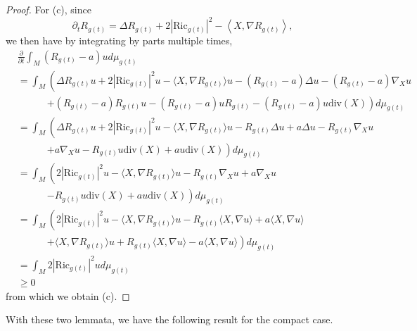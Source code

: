 \documentclass[12pt]{amsart}
\newcommand{\del}{\nabla}
\theoremstyle{remark}
\numberwithin{equation}{section}
\begin{document}
\begin{proof}
    For (c), since
    \begin{equation*}
        \partial_t R_{g(t)} = \Delta R_{g(t)} + 2|\text{Ric}_{g(t)}|^2 - \left\langle X, \del R_{g(t)}\right\rangle,
    \end{equation*}
    we then have by integrating by parts multiple times,
    \begin{align*}
        &\frac{\partial}{\partial t} \int_M (R_{g(t)}-a)ud\mu_{g(t)} \nonumber \\
        &= \int_M \left(\Delta R_{g(t)} u + 2|\text{Ric}_{g(t)}|^2 u - \langle X, \del R_{g(t)}\rangle u - (R_{g(t)} - a)\Delta u - (R_{g(t)} - a)\del_X u \right. \nonumber \\
        &\qquad\quad \left. + (R_{g(t)} - a)R_{g(t)}u - (R_{g(t)} - a)uR_{g(t)} - (R_{g(t)} - a)u\text{div}(X)\right)d\mu_{g(t)} \nonumber \\
        &= \int_M \left( \Delta R_{g(t)} u + 2 |\text{Ric}_{g(t)}|^2 u - \langle X, \del R_{g(t)}\rangle u - R_{g(t)}\Delta u + a\Delta u - R_{g(t)}\del_Xu \right. \nonumber \\
        &\qquad\quad \left. + a\del_Xu - R_{g(t)}u\text{div}(X) + au\text{div}(X)\right)d\mu_{g(t)} \nonumber \\
        &= \int_M \left(2 |\text{Ric}_{g(t)}|^2 u - \langle X, \del R_{g(t)}\rangle u - R_{g(t)}\del_Xu + a\del_Xu \right. \nonumber \\
        &\qquad\quad \left. - R_{g(t)}u\text{div}(X) + au\text{div}(X)\right)d\mu_{g(t)} \nonumber \\
        &= \int_M \left(2 |\text{Ric}_{g(t)}|^2 u - \langle X, \del R_{g(t)}\rangle u - R_{g(t)}\langle X, \del u \rangle + a\langle X, \del u\rangle \right. \nonumber \\
        &\qquad\quad \left. + \langle X, \del R_{g(t)}\rangle u + R_{g(t)}\langle X, \del u\rangle - a \langle X, \del u\rangle\right)d\mu_{g(t)} \nonumber \\
        &= \int_M 2|\text{Ric}_{g(t)}|^2 ud\mu_{g(t)} \nonumber \\
        &\geq 0
    \end{align*}
    from which we obtain (c).
\end{proof}

With these two lemmata, we have the following result for the compact case.
\end{document}
